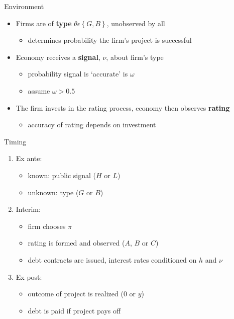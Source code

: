 \documentclass{beamer}
\begin{document}
\begin{frame}{Environment}
\begin{itemize}
	\item Firms are of \textbf{type} $\theta \epsilon \left\{G,B\right\}$, unobserved by all
	\begin{itemize}
		\item determines probability the firm's project is successful
	\end{itemize}
	\item Economy receives a \textbf{signal}, $\nu$, about firm's type
	\begin{itemize}
		\item probability signal is `accurate' is $\omega$
		\item assume $\omega > 0.5$
	\end{itemize}
	\item The firm invests in the rating process, economy then observes \textbf{rating}
	\begin{itemize}
		\item accuracy of rating depends on investment
	\end{itemize}
\end{itemize}
\end{frame}

\begin{frame}{Timing}
\begin{enumerate}
	\item Ex ante:
	\begin{itemize}
		\item known: public signal ($H$ or $L$)
		\item unknown: type ($G$ or $B$)
	\end{itemize}
	\item Interim:
	\begin{itemize}
		\item firm chooses $\pi$
		\item rating is formed and observed ($A$, $B$ or $C$)
		\item debt contracts are issued, interest rates conditioned on $h$ and $\nu$
	\end{itemize}
	\item Ex post:
	\begin{itemize}
		\item outcome of project is realized (0 or $y$)
		\item debt is paid if project pays off
	\end{itemize}
\end{enumerate}
\end{frame}
\end{document}
